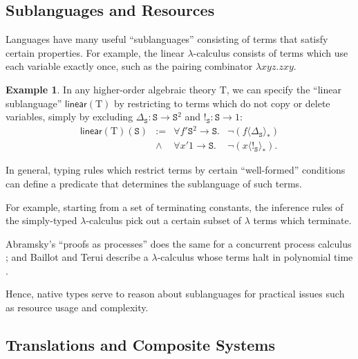 \documentclass[conference]{IEEEtran}
\theoremstyle{definition}
\newtheorem{example}[theorem]{Example}
\newcommand{\msf}[1]{\mathsf{#1}}
\newcommand{\mrm}[1]{\mathrm{#1}}
\newcommand{\mtt}[1]{\mathtt{#1}}
\newcommand{\T}{\mrm{T}}
\newcommand{\tts}{\mtt{S}}
\begin{document}

\subsection{Sublanguages and Resources}
\label{ssec:sublang}

Languages have many useful ``sublanguages'' consisting of terms that satisfy certain properties. For example, the linear $\lambda$-calculus consists of terms which use each variable exactly once, such as the pairing combinator $\lambda xyz.zxy$.

\begin{example}
    In any higher-order algebraic theory $\T$, we can specify the ``linear sublanguage'' $\msf{linear}(\T)$ by restricting to terms which do not copy or delete variables, simply by excluding $\Delta_\tts:\tts\to \tts^2$ and $!_\tts:\tts\to 1$:
    \[\begin{array}{lcll}
        \msf{linear}(\T)(\tts) & := &  \forall f'\tts^2 \to \tts. & \neg(f \langle\Delta_\tts\rangle_*)\\
        & \land & \forall x'1\to \tts. & \neg(x\langle!_\tts\rangle_*).
    \end{array}\]
\end{example}

In general, typing rules which restrict terms by certain ``well-formed'' conditions can define a predicate that determines the sublanguage of such terms.

For example, starting from a set of terminating constants, the inference rules of the simply-typed $\lambda$-calculus pick out a certain subset of $\lambda$ terms which terminate.

Abramsky's ``proofs as processes'' does the same for a concurrent process calculus \cite{ProofAsProcess}; and Baillot and Terui describe a $\lambda$-calculus whose terms halt in polynomial time \cite{BaillotTerui}.

Hence, native types serve to reason about sublanguages for practical issues such as resource usage and complexity.

\subsection{Translations and Composite Systems}
\label{ssec:composite}
\end{document}
